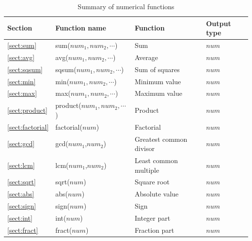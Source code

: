 \begin{table}[!hb]
\begin{center}
\caption{Summary of numerical functions \label{tbl_mcal_func_num}}
{\small
  \begin{tabular}{l|l|l|l} \hline
Section&Function name&Function&Output type\\ \hline

\ref{sect:sum}& sum($num_1,num_2,\cdots$)&
Sum&
$num$\\

\ref{sect:avg}& avg($num_1,num_2,\cdots$)&
Average&
$num$\\

\ref{sect:sqsum}& sqsum($num_1,num_2,\cdots$)&
Sum of squares&
$num$\\

\ref{sect:min}& min($num_1,num_2,\cdots$)&
Minimum value&
$num$\\

\ref{sect:max}& max($num_1,num_2,\cdots$)&
Maximum value&
$num$\\

\ref{sect:product}& product($num_1,num_2,\cdots$)&
Product&
$num$\\

\ref{sect:factorial}& factorial($num$)&
Factorial&
$num$\\

\ref{sect:gcd}& gcd($num_1$,$num_2$)&
Greatest common divisor&
$num$\\

\ref{sect:lcm}& lcm($num_1$,$num_2$)&
Least common multiple&
$num$\\

\ref{sect:sqrt}& sqrt($num$)&
Square root&
$num$\\

\ref{sect:abs}& abs($num$)&
Absolute value&
$num$\\

\ref{sect:sign}& sign($num$)&
Sign&
$num$\\

\ref{sect:int}& int($num$)&
Integer part&
$num$\\

\ref{sect:fract}& fract($num$)&
Fraction part&
$num$\\




\end{tabular}}
\end{center}
\end{table}
